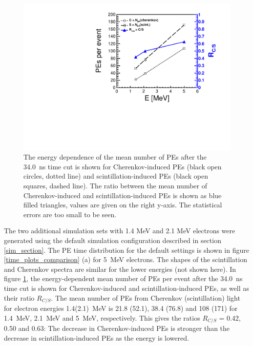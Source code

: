\documentclass[cits]{JINST}
\begin{document}
\begin{figure}
        \begin{center}
        \includegraphics[scale=0.5]{graphs/PEandR_vs_energy_final.pdf}
        \caption[]{The energy dependence of the mean number of PEs after the 34.0~ns time cut is shown for Cherenkov-induced PEs (black open circles, dotted line) and scintillation-induced PEs (black open squares, dashed line). The ratio between the mean number of Cherenkov-induced and scintillation-induced PEs is shown as blue filled triangles, values are given on the right y-axis. The statistical errors are too small to be seen. \label{Edep_NPE}}
        \end{center}
\end{figure}

The two additional simulation sets with 1.4 MeV and 2.1 MeV electrons were
generated using the default simulation configuration described in section
\ref{sim_section}. The PE time distribution for the default settings is shown
in figure \ref{time_plots_comparison} (a) for 5~MeV electrons. The shapes
of the scintillation and Cherenkov spectra are similar for the lower energies (not
shown here). In figure \ref{Edep_NPE}, the energy-dependent mean number of
PEs per event after the 34.0~ns time cut is shown for Cherenkov-induced and
scintillation-induced PEs, as well as their ratio $R_{C/S}$. The mean number
of PEs from Cherenkov (scintillation) light for electron energies 1.4(2.1)~MeV is 21.8 (52.1), 38.4 (76.8)
and 108 (171) for 1.4~MeV, 2.1~MeV and 5~MeV, respectively. This gives the
ratios $R_{C/S}$ = 0.42, 0.50 and 0.63: The decrease in Cherenkov-induced
PEs is stronger than the decrease in scintillation-induced PEs as the energy
is lowered.
\end{document}
